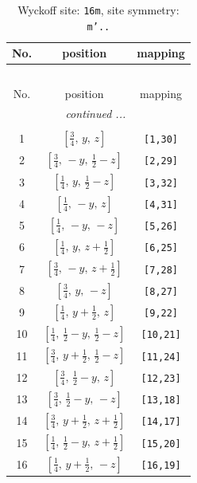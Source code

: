 \documentclass[fleqn,8pt]{jsarticle}
\begin{document}
\renewcommand{\arraystretch}{1.2}
\begin{longtable}{ccc}
\caption{Wyckoff site: {\tt 16m}, site symmetry: {\tt m'..}}
 \\
 \hline \hline
No. & position & mapping \\ \hline \endfirsthead

\multicolumn{2}{l}{\tablename\ \thetable{}} \\
 \hline \hline
No. & position & mapping \\ \hline \endhead

 \hline \hline
\multicolumn{2}{r}{\footnotesize\it continued ...} \\ \endfoot

 \hline \hline
\multicolumn{2}{r}{} \\ \endlastfoot

1 & $\left[ \frac{3}{4},\, y,\, z \right]$ & {\tt [1,30]} \\ \hline
2 & $\left[ \frac{3}{4},\, - y,\, \frac{1}{2} - z \right]$ & {\tt [2,29]} \\ \hline
3 & $\left[ \frac{1}{4},\, y,\, \frac{1}{2} - z \right]$ & {\tt [3,32]} \\ \hline
4 & $\left[ \frac{1}{4},\, - y,\, z \right]$ & {\tt [4,31]} \\ \hline
5 & $\left[ \frac{1}{4},\, - y,\, - z \right]$ & {\tt [5,26]} \\ \hline
6 & $\left[ \frac{1}{4},\, y,\, z + \frac{1}{2} \right]$ & {\tt [6,25]} \\ \hline
7 & $\left[ \frac{3}{4},\, - y,\, z + \frac{1}{2} \right]$ & {\tt [7,28]} \\ \hline
8 & $\left[ \frac{3}{4},\, y,\, - z \right]$ & {\tt [8,27]} \\ \hline
9 & $\left[ \frac{1}{4},\, y + \frac{1}{2},\, z \right]$ & {\tt [9,22]} \\ \hline
10 & $\left[ \frac{1}{4},\, \frac{1}{2} - y,\, \frac{1}{2} - z \right]$ & {\tt [10,21]} \\ \hline
11 & $\left[ \frac{3}{4},\, y + \frac{1}{2},\, \frac{1}{2} - z \right]$ & {\tt [11,24]} \\ \hline
12 & $\left[ \frac{3}{4},\, \frac{1}{2} - y,\, z \right]$ & {\tt [12,23]} \\ \hline
13 & $\left[ \frac{3}{4},\, \frac{1}{2} - y,\, - z \right]$ & {\tt [13,18]} \\ \hline
14 & $\left[ \frac{3}{4},\, y + \frac{1}{2},\, z + \frac{1}{2} \right]$ & {\tt [14,17]} \\ \hline
15 & $\left[ \frac{1}{4},\, \frac{1}{2} - y,\, z + \frac{1}{2} \right]$ & {\tt [15,20]} \\ \hline
16 & $\left[ \frac{1}{4},\, y + \frac{1}{2},\, - z \right]$ & {\tt [16,19]} \\
\end{longtable}
\end{document}
